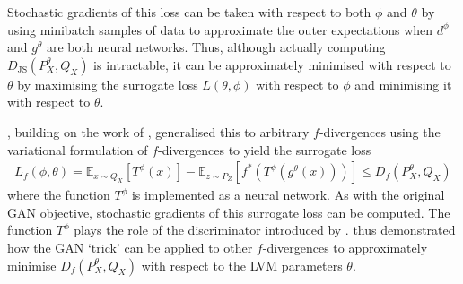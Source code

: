 Stochastic gradients of this loss can be taken with respect to both $\phi$ and $\theta$ by using minibatch samples of data to approximate the outer expectations when $d^\phi$ and $g^\theta$ are both neural networks.
Thus, although actually computing $D_{\text{JS}}(P^\theta_X, Q_X)$ is intractable, it can be approximately minimised with respect to $\theta$ by maximising the surrogate loss $L(\theta, \phi)$ with respect to $\phi$ and minimising it with respect to $\theta$.


\cite{nowozin2016f}, building on the work of \cite{nguyen10ratio}, generalised this to arbitrary $f$-divergences using the variational formulation of $f$-divergences to yield the surrogate loss
%
%
\begin{align*}
L_f(\phi, \theta) = \mathbb{E}_{x \sim Q_X} \left[ T^\phi(x) \right] - \mathbb{E}_{z \sim P_Z} \left[ f^*(T^\phi(g^\theta(x))) \right] \leq D_f(P^\theta_X, Q_X)
\end{align*}
%
where the function $T^\phi$ is implemented as a neural network.
As with the original GAN objective, stochastic gradients of this surrogate loss can be computed. 
The function $T^\phi$ plays the role of the discriminator introduced by \cite{goodfellow2014generative}. %
\cite{nowozin2016f} thus demonstrated how the GAN `trick' can be applied to other $f$-divergences to approximately minimise $D_f(P^\theta_X, Q_X)$ with respect to the LVM parameters $\theta$.

